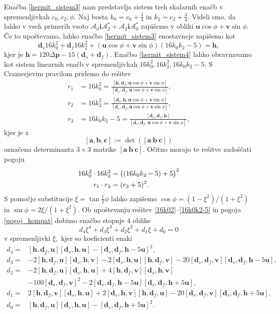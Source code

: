 \documentclass[12pt,a4paper,twoside]{article}
\theoremstyle{definition} %
\theoremstyle{plain} %
\theoremstyle{primerstyle}
\numberwithin{equation}{section}  %
\newcommand{\aV}{\mathbf{a}}
\newcommand{\bV}{\mathbf{b}}
\newcommand{\cV}{\mathbf{c}}
\newcommand{\dV}{\mathbf{d}}
\newcommand{\hV}{\mathbf{h}}
\newcommand{\pV}{\mathbf{p}}
\newcommand{\iV}{\mathbf{i}}
\newcommand{\uV}{\mathbf{u}}
\newcommand{\vV}{\mathbf{v}}
\newcommand{\AQ}{\mathcal{A}}
\begin{document}
Enačba \eqref{hermit_sistem3} nam predstavlja sistem treh skalarnih enačb v spremenljivkah $c_0,c_2,\phi.$ Naj bosta $k_0=c_0+\frac{3}{4}$ in $k_2=c_2+\frac{3}{4}.$ Videli smo, da lahko v vseh primerih vsoto $\AQ_0\iV\AQ_2^*+\AQ_2\iV\AQ_0^*$ zapišemo v obliki $\uV\cos\phi+\vV\sin\phi$. Če to upoštevamo, lahko enačbo \eqref{hermit_sistem3} enostavneje zapišemo kot
\begin{equation}
	\label{hermit_sistem4}
	\dV_s16k_0^2+\dV_f16k_2^2+(\uV\cos\phi+\vV\sin\phi)(16k_0k_2-5)=\hV,
\end{equation}
kjer je $\hV=120\Delta\pV-15(\dV_s+\dV_f)$. Enačbo \eqref{hermit_sistem4} lahko obravnavamo kot sistem linearnih enačb v spremenljivkah $16k_0^2,16k_2^2,16k_0k_2-5.$ S Cramerjevim pravilom pridemo do rešitev
\begin{align}
	r_1&=16k_0^2=\frac{[\hV,\dV_f,\uV\cos\phi+\vV\sin\phi]}{[\dV_s,\dV_f,\uV\cos\phi+\vV\sin\phi]},\label{16k02}\\
	r_2&=16k_2^2=\frac{[\dV_s,\hV,\uV\cos\phi+\vV\sin\phi]}{[\dV_s,\dV_f,\uV\cos\phi+\vV\sin\phi]},\label{16k22}\\
	r_3&=16k_0k_2-5=\frac{[\dV_s,\dV_f,\hV]}{[\dV_s,\dV_f,\uV\cos\phi+\vV\sin\phi]}\label{16k0k2-5},
\end{align}
kjer je z $$[\aV,\bV,\cV]:=\det([\aV\ \bV\ \cV])$$ označena determinanta $3\times3$ matrike $[\aV\ \bV\ \cV].$ Očitno morajo te rešitve zadoščati pogoju
\begin{align}
	\label{pogoj_kompat}
	16k_0^2\cdot16k_2^2&=\big((16k_0k_2-5)+5\big)^2\notag\\
	r_1\cdot r_2&=(r_3+5)^2.
\end{align}
S pomočjo substitucije $\xi=\tan\frac{1}{2}\phi$ lahko zapišemo $\cos\phi=(1-\xi^2)/(1+\xi^2)$ in $\sin\phi=2\xi/(1+\xi^2).$ Ob upoštevanju rešitev \eqref{16k02}--\eqref{16k0k2-5} in pogoja \eqref{pogoj_kompat} dobimo enačbo stopnje 4 oblike
\begin{equation}
	\label{enacba_stopnja4}
	d_4\xi^4+d_3\xi^3+d_2\xi^2+d_1\xi+d_0=0
\end{equation}
v spremenljivki $\xi,$ kjer so koeficienti enaki
\begin{align}
	\label{d_koeficienti}
	d_4=&[\hV,\dV_f,\uV][\dV_s,\hV,\uV]-[\dV_s,\dV_f,\hV-5\uV]^2,\nonumber\\
	d_3=&-2[\hV,\dV_f,\uV][\dV_s,\hV,\vV]-2[\dV_s,\hV,\uV][\hV,\dV_f,\vV]-20[\dV_s,\dV_f,\vV][\dV_s,\dV_f,\hV-5\uV],\nonumber\\
	d_2=&-2[\hV,\dV_f,\uV][\dV_s,\hV,\uV]+4[\hV,\dV_f,\vV][\dV_s,\hV,\vV]\nonumber\\
	&-100[\dV_s,\dV_f,\vV]^2-2[\dV_s,\dV_f,\hV-5\uV][\dV_s,\dV_f,\hV+5\uV],\\
	d_1=&2[\hV,\dV_f,\vV][\dV_s,\hV,\uV]+2[\dV_s,\hV,\vV][\hV,\dV_f,\uV]-20[\dV_s,\dV_f,\vV][\dV_s,\dV_f,\hV+5\uV],\nonumber\\
	d_0=&[\hV,\dV_f,\uV][\dV_s,\hV,\uV]-[\dV_s,\dV_f,\hV+5\uV]^2.\nonumber
\end{align}
\end{document}
